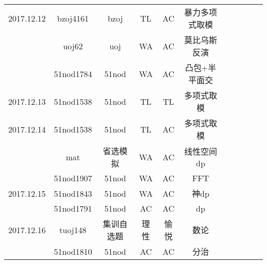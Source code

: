 \documentclass[landscape]{article}
\begin{document}
\begin{longtable}{ccccccccccc}
  \hline
  2017.12.12 & bzoj4161 & bzoj & TL & AC & 暴力多项式取模\\
  & uoj62 & uoj & WA & AC & 莫比乌斯反演\\
  & 51nod1784 & 51nod & WA & AC & 凸包+半平面交\\
  \hline
  2017.12.13 & 51nod1538 & 51nod & TL & TL & 多项式取模\\
  \hline
  2017.12.14 & 51nod1538 & 51nod & TL & AC & 多项式取模\\
  & mat & 省选模拟 & WA & AC & 线性空间dp\\
  & 51nod1907 & 51nod & WA & AC & FFT\\
  \hline
  2017.12.15 & 51nod1843 & 51nod & WA & AC & 神dp\\
  & 51nod1791 & 51nod & AC & AC & dp\\
  \hline
  2017.12.16 & tuoj148 & 集训自选题 & 理性 & 愉悦 & 数论\\
  & 51nod1810 & 51nod & AC & AC & 分治\\
  \hline
\end{longtable}
\end{document}
